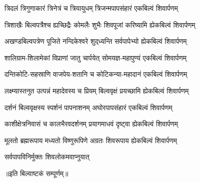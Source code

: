 
\twolineshloka
{त्रिदलं त्रिगुणाकारं त्रिनेत्रं च त्रियायुधम्}
{त्रिजन्मपापसंहारं एकबिल्वं शिवार्पणम्}%

\twolineshloka
{त्रिशाखैः बिल्वपत्रैश्च ह्यच्छिद्रैः कोमलैः शुभैः}
{शिवपूजां करिष्यामि ह्येकबिल्वं शिवार्पणम्}%

\twolineshloka
{अखण्डबिल्वपत्रेण पूजिते नन्दिकेश्वरे}
{शुद्‌ध्यन्ति सर्वपापेभ्यो ह्येकबिल्वं शिवार्पणम्}%

\twolineshloka
{शालिग्राम-शिलामेकां विप्राणां जातु चार्पयेत्}
{सोमयज्ञ-महापुण्यं एकबिल्वं शिवार्पणम्}%

\twolineshloka
{दन्तिकोटि-सहस्राणि वाजपेय-शतानि च}
{कोटिकन्या-महादानं एकबिल्वं शिवार्पणम्}%

\twolineshloka
{लक्ष्म्यास्तनुत उत्पन्नं महादेवस्य च प्रियम्}
{बिल्ववृक्षं प्रयच्छामि ह्येकबिल्वं शिवार्पणम्}%

\twolineshloka
{दर्शनं बिल्ववृक्षस्य स्पर्शनं पापनाशनम्}
{अघोरपापसंहारं एकबिल्वं शिवार्पणम्}%

\twolineshloka
{काशीक्षेत्रनिवासं च कालभैरवदर्शनम्}
{प्रयागमाधवं दृष्ट्वा ह्येकबिल्वं शिवार्पणम्}%

\twolineshloka
{मूलतो ब्रह्मरूपाय मध्यतो विष्णुरूपिणे}
{अग्रतः शिवरूपाय ह्येकबिल्वं शिवार्पणम्}%

{सर्वपापविनिर्मुक्तः शिवलोकमवाप्नुयात्}%

{॥इति बिल्वाष्टकं सम्पूर्णम्॥}